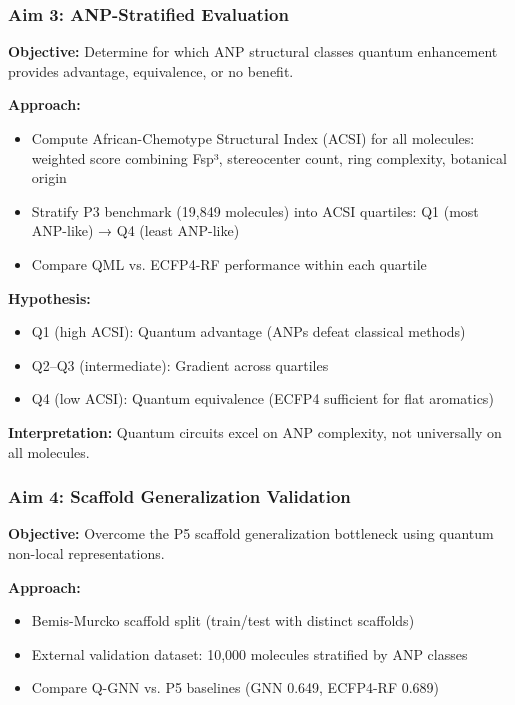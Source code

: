 \documentclass[11pt,a4paper]{article}
\begin{document}
\subsubsection{Aim 3: ANP-Stratified Evaluation}

\textbf{Objective:} Determine for which ANP structural classes quantum enhancement provides advantage, equivalence, or no benefit.

\textbf{Approach:}
\begin{itemize}
    \item Compute African-Chemotype Structural Index (ACSI) for all molecules: weighted score combining Fsp³, stereocenter count, ring complexity, botanical origin
    \item Stratify P3 benchmark (19,849 molecules) into ACSI quartiles: Q1 (most ANP-like) → Q4 (least ANP-like)
    \item Compare QML vs. ECFP4-RF performance within each quartile
\end{itemize}

\textbf{Hypothesis:}
\begin{itemize}
    \item Q1 (high ACSI): Quantum advantage (ANPs defeat classical methods)
    \item Q2--Q3 (intermediate): Gradient across quartiles
    \item Q4 (low ACSI): Quantum equivalence (ECFP4 sufficient for flat aromatics)
\end{itemize}

\textbf{Interpretation:} Quantum circuits excel on ANP complexity, not universally on all molecules.

\subsubsection{Aim 4: Scaffold Generalization Validation}

\textbf{Objective:} Overcome the P5 scaffold generalization bottleneck using quantum non-local representations.

\textbf{Approach:}
\begin{itemize}
    \item Bemis-Murcko scaffold split (train/test with distinct scaffolds)
    \item External validation dataset: 10,000 molecules stratified by ANP classes
    \item Compare Q-GNN vs. P5 baselines (GNN 0.649, ECFP4-RF 0.689)
\end{itemize}
\end{document}
